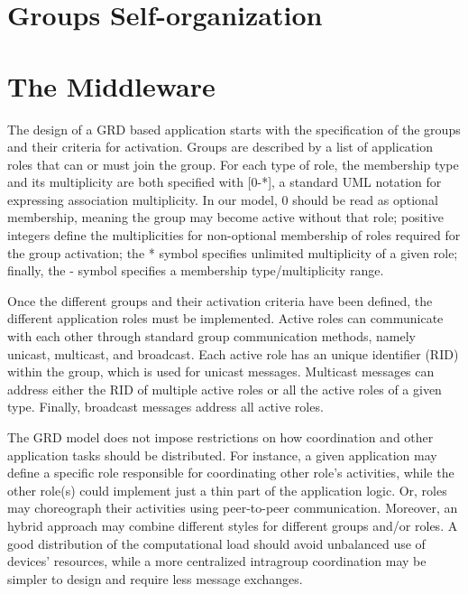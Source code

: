 \section{Groups Self-organization}
\label{sec:self_organization}

\section{The Middleware}
\label{sec:middleware}

The design of a GRD based application starts with the specification of the groups and their criteria for activation. Groups are described by a list of application roles that can or must join the group. For each type of role, the membership type and its multiplicity are both specified with [0-*], a standard UML notation for expressing association multiplicity. In our model, 0 should be read as optional membership, meaning the group may become active without that role; positive integers define the multiplicities for non-optional membership of roles required for the group activation; the * symbol specifies unlimited multiplicity of a given role; finally, the - symbol specifies a membership type/multiplicity range.

Once the different groups and their activation criteria have been defined, the different application roles must be implemented. Active roles can communicate with each other through standard group communication methods, namely unicast, multicast, and broadcast. Each active role has an unique identifier (RID) within the group, which is used for unicast messages. Multicast messages can address either the RID of multiple active roles or all the active roles of a given type. Finally, broadcast messages address all active roles.

The GRD model does not impose restrictions on how coordination and other application tasks should be distributed. For instance, a given application may define a specific role responsible for coordinating other role's activities, while the other role(s) could implement just a thin part of the application logic. Or, roles may choreograph their activities using peer-to-peer communication. Moreover, an hybrid approach may combine different styles for different groups and/or roles. A good distribution of the computational load should avoid unbalanced use of devices' resources, while a more centralized intragroup coordination may be simpler to design and require less message exchanges.


